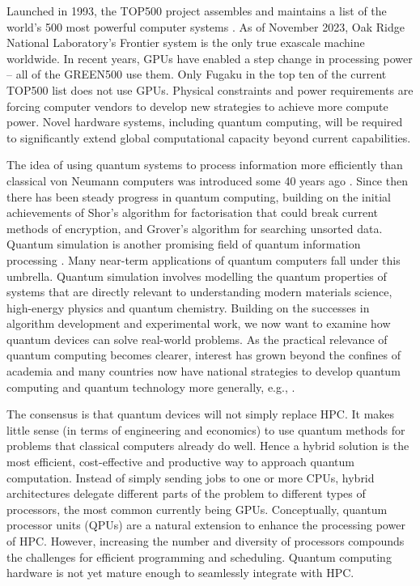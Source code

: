 \documentclass[10pt]{iopart}
\begin{document}
Launched in 1993, the TOP500 project assembles and maintains a list of the world's 500 most powerful computer systems \cite{top500}. As of November 2023, Oak Ridge National Laboratory's Frontier system is the only true exascale machine worldwide. In recent years, GPUs have enabled a step change in processing power -- all of the GREEN500 \cite{green500} use them. Only Fugaku in the top ten of the current TOP500 list \cite{top500} does not use GPUs. Physical constraints and power requirements are forcing computer vendors to develop new strategies to achieve more compute power. Novel hardware systems, including quantum computing, will be required to significantly extend global computational capacity beyond current capabilities.

The idea of using quantum systems to process information more efficiently than classical von Neumann computers was introduced some 40 years ago \cite{Feynman1982,Deutsch1985}. Since then there has been steady progress in quantum computing, building on the initial achievements of Shor's algorithm for factorisation \cite{Shor1994} that could break current methods of encryption, and Grover's algorithm \cite{Grover1996,Grover1997} for searching unsorted data. Quantum simulation is another promising field of quantum information processing \cite{Georgescu2014,Altman2021}. Many near-term applications of quantum computers fall under this umbrella. Quantum simulation involves modelling the quantum properties of systems that are directly relevant to understanding modern materials science, high-energy physics and quantum chemistry. Building on the successes in algorithm development and experimental work, we now want to examine how quantum devices can solve real-world problems. As the practical relevance of quantum computing becomes clearer, interest has grown beyond the confines of academia and many countries now have national strategies to develop quantum computing and quantum technology more generally, e.g., \cite{DSIT2023,Acin2018,Monroe2019}.

The consensus is that quantum devices will not simply replace HPC. It makes little sense (in terms of engineering and economics) to use quantum methods for problems that classical computers already do well.  Hence a hybrid solution is the most efficient, cost-effective and productive way to approach quantum computation. Instead of simply sending jobs to one or more CPUs, hybrid architectures delegate different parts of the problem to different types of processors, the most common currently being GPUs. Conceptually, quantum processor units (QPUs) are a natural extension to enhance the processing power of HPC. However, increasing the number and diversity of processors compounds the challenges for efficient programming and scheduling. Quantum computing hardware is not yet mature enough to seamlessly integrate with HPC.
\end{document}
